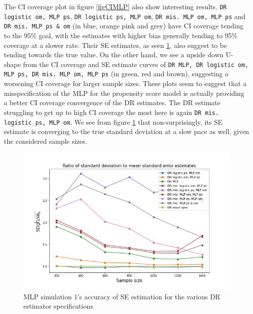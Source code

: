 \documentclass[12pt,twoside]{article}
\begin{document}
The CI coverage plot in figure \ref{figCIMLP} also show interesting results. \texttt{DR logistic om, MLP ps}, \texttt{DR logistic ps, MLP om}, \texttt{DR mis. MLP om, MLP ps} and \texttt{DR mis. MLP ps \& om} (in blue, orange pink and grey) have CI coverage tending to the 95\% goal, with the estimates with higher bias generally tending to 95\% coverage at a slower rate. Their SE estimates, as seen \ref{figSEMLP}, also suggest to be tending towards the true value. On the other hand, we see a upside down U-shape from the CI coverage and SE estimate curves of \texttt{DR MLP, DR logistic om, MLP ps, DR mis. MLP om, MLP ps} (in green, red and brown), suggesting a worsening CI coverage for larger sample sizes. These plots seem to suggest that a misspecification of the MLP for the propensity score model is actually providing a better CI coverage convergence of the DR estimates. The DR estimate struggling to get up to high CI coverage the most here is again \texttt{DR mis. logistic ps, MLP om}. We see from figure \ref{figSEMLP} that non-surprisingly, its SE estimate is converging to the true standard deviation at a slow pace as well, given the considered sample sizes. 

\begin{figure}[h!]
    \centering
    \includegraphics[width = 0.9\columnwidth]{figures/SEMLP.png}
    \caption{MLP simulation 1's accuracy of \citet{lunceford_davidian} SE estimation for the various DR estimator specifications}
    \label{figSEMLP}
\end{figure}
\end{document}
